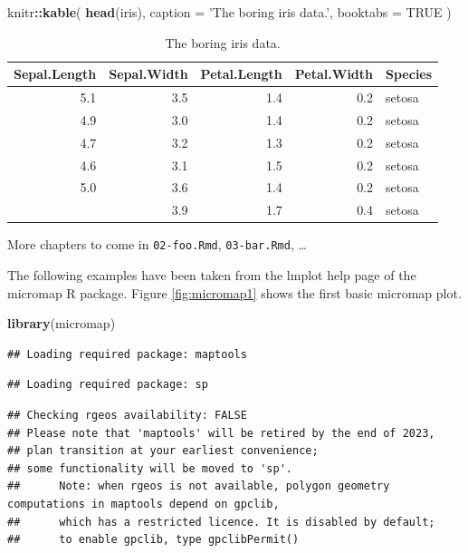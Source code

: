 \documentclass[
]{krantz}
\makeatletter
\newenvironment{Shaded}{\begin{snugshade}}{\end{snugshade}}
\newcommand{\DataTypeTok}[1]{\textcolor[rgb]{0.27,0.27,0.27}{#1}}
\newcommand{\KeywordTok}[1]{\textcolor[rgb]{0.27,0.27,0.27}{\textbf{#1}}}
\newcommand{\NormalTok}[1]{#1}
\newcommand{\OperatorTok}[1]{\textcolor[rgb]{0.43,0.43,0.43}{\textbf{#1}}}
\newcommand{\OtherTok}[1]{\textcolor[rgb]{0.37,0.37,0.37}{#1}}
\newcommand{\StringTok}[1]{\textcolor[rgb]{0.5,0.5,0.5}{#1}}
\newenvironment{kframe}{%
\medskip{}
\setlength{\fboxsep}{.8em}
 \def\at@end@of@kframe{}%
 \ifinner\ifhmode%
  \def\at@end@of@kframe{\end{minipage}}%
  \begin{minipage}{\columnwidth}%
 \fi\fi%
 \def\FrameCommand##1{\hskip\@totalleftmargin \hskip-\fboxsep
 \colorbox{shadecolor}{##1}\hskip-\fboxsep
     \hskip-\linewidth \hskip-\@totalleftmargin \hskip\columnwidth}%
 \MakeFramed {\advance\hsize-\width
   \@totalleftmargin\z@ \linewidth\hsize
   \@setminipage}}%
 {\par\unskip\endMakeFramed%
 \at@end@of@kframe}
\renewenvironment{Shaded}{\begin{kframe}}{\end{kframe}}
\makeatother
\begin{document}
\begin{Shaded}
\begin{Highlighting}[]
\NormalTok{knitr}\OperatorTok{::}\KeywordTok{kable}\NormalTok{(}
  \KeywordTok{head}\NormalTok{(iris), }\DataTypeTok{caption =} \StringTok{'The boring iris data.'}\NormalTok{,}
  \DataTypeTok{booktabs =} \OtherTok{TRUE}
\NormalTok{)}
\end{Highlighting}
\end{Shaded}

\begin{table}

\caption{\label{tab:iris}The boring iris data.}
\centering
\begin{tabular}[t]{rrrrl}
\toprule
Sepal.Length & Sepal.Width & Petal.Length & Petal.Width & Species\\
\midrule
5.1 & 3.5 & 1.4 & 0.2 & setosa\\
4.9 & 3.0 & 1.4 & 0.2 & setosa\\
4.7 & 3.2 & 1.3 & 0.2 & setosa\\
4.6 & 3.1 & 1.5 & 0.2 & setosa\\
5.0 & 3.6 & 1.4 & 0.2 & setosa\\
\addlinespace
5.4 & 3.9 & 1.7 & 0.4 & setosa\\
\bottomrule
\end{tabular}
\end{table}

More chapters to come in \texttt{02-foo.Rmd}, \texttt{03-bar.Rmd}, \ldots{}

The following examples have been taken from the lmplot help page of the micromap R package.
Figure \ref{fig:micromap1} shows the first basic micromap plot.

\begin{Shaded}
\begin{Highlighting}[]
\KeywordTok{library}\NormalTok{(micromap)}
\end{Highlighting}
\end{Shaded}

\begin{verbatim}
## Loading required package: maptools
\end{verbatim}

\begin{verbatim}
## Loading required package: sp
\end{verbatim}

\begin{verbatim}
## Checking rgeos availability: FALSE
## Please note that 'maptools' will be retired by the end of 2023,
## plan transition at your earliest convenience;
## some functionality will be moved to 'sp'.
##      Note: when rgeos is not available, polygon geometry     computations in maptools depend on gpclib,
##      which has a restricted licence. It is disabled by default;
##      to enable gpclib, type gpclibPermit()
\end{verbatim}
\end{document}
